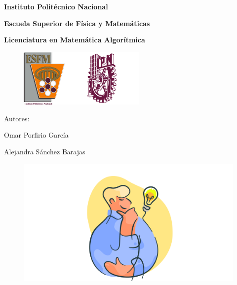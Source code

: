 

	\lstset{style = mystyle}
	\begin{titlepage}
		\centering
		
		{\bfseries\LARGE Instituto Politécnico Nacional\par}
		
		{\bfseries\Large Escuela Superior de Física y Matemáticas\par}
		
		{\bfseries\Large Licenciatura en Matemática Algorítmica\par}
		\vspace{0.5cm}
		{
			\begin{figure}[h]
				\begin{center}
					\includegraphics[width=2.2cm]{Images/Escudos/ESCUDO_ESFM.png}\includegraphics[width=4cm]{Images/Escudos/ipn2.png}\par
				\end{center}
			\end{figure}
		}
		\vspace{1cm}
		{\Huge \hwname\par}
		\vspace{1.5cm}
		{\Large Autores:\par}
		{\Large Omar Porfirio García\par}
		{\Large Alejandra Sánchez Barajas\par}
		\begin{figure}[h]
			\centering
			\includegraphics[width=\linewidth]{Images/Escudos/Pensamientof.pdf}
		\end{figure}
	\end{titlepage}
